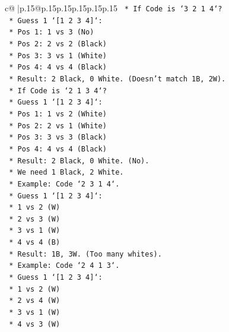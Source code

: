\documentclass{article}
\begin{document}
{\begin{supertabular}{c@{$\;$}|p{.15\linewidth}@{}p{.15\linewidth}p{.15\linewidth}p{.15\linewidth}p{.15\linewidth}p{.15\linewidth}}
{{{\texttt{            *   If Code is `3 2 1 4`?} \\
\texttt{                *   Guess 1 `{[}1 2 3 4{]}`:} \\
\texttt{                    *   Pos 1: 1 vs 3 (No)} \\
\texttt{                    *   Pos 2: 2 vs 2 (Black)} \\
\texttt{                    *   Pos 3: 3 vs 1 (White)} \\
\texttt{                    *   Pos 4: 4 vs 4 (Black)} \\
\texttt{                    *   Result: 2 Black, 0 White. (Doesn't match 1B, 2W).} \\
\texttt{            *   If Code is `2 1 3 4`?} \\
\texttt{                *   Guess 1 `{[}1 2 3 4{]}`:} \\
\texttt{                    *   Pos 1: 1 vs 2 (White)} \\
\texttt{                    *   Pos 2: 2 vs 1 (White)} \\
\texttt{                    *   Pos 3: 3 vs 3 (Black)} \\
\texttt{                    *   Pos 4: 4 vs 4 (Black)} \\
\texttt{                    *   Result: 2 Black, 0 White. (No).} \\
\texttt{            *   We need 1 Black, 2 White.} \\
\texttt{            *   Example: Code `2 3 1 4`.} \\
\texttt{                *   Guess 1 `{[}1 2 3 4{]}`:} \\
\texttt{                    *   1 vs 2 (W)} \\
\texttt{                    *   2 vs 3 (W)} \\
\texttt{                    *   3 vs 1 (W)} \\
\texttt{                    *   4 vs 4 (B)} \\
\texttt{                    *   Result: 1B, 3W. (Too many whites).} \\
\texttt{            *   Example: Code `2 4 1 3`.} \\
\texttt{                *   Guess 1 `{[}1 2 3 4{]}`:} \\
\texttt{                    *   1 vs 2 (W)} \\
\texttt{                    *   2 vs 4 (W)} \\
\texttt{                    *   3 vs 1 (W)} \\
\texttt{                    *   4 vs 3 (W)} \\
}}}
\end{supertabular}}
\end{document}
